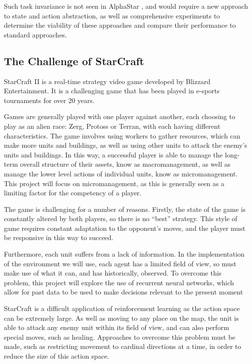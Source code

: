 Such task invariance is not seen in AlphaStar \cite{alphastar}, and would require a new approach to state and action abstraction, as well as comprehensive experiments to determine the viability of these approaches and compare their performance to standard approaches.


\subsection{The Challenge of StarCraft}

StarCraft II is a real-time strategy video game developed by Blizzard Entertainment. It is a challenging game that has been played in e-sports tournaments for over 20 years.

Games are generally played with one player against another, each choosing to play as an alien race: Zerg, Protoss or Terran, with each having different characteristics. The game involves using workers to gather resources, which can make more units and buildings, as well as using other units to attack the enemy's units and buildings. In this way, a successful player is able to manage the long-term overall structure of their assets, know as macromanagement, as well as manage the lower level actions of individual units, know as micromanagement. This project will focus on micromanagement, as this is generally seen as a limiting factor for the competency of a player.

The game is challenging for a number of reasons. Firstly, the state of the game is constantly altered by both players, so there is no ``best'' strategy. This style of game requires constant adaptation to the opponent's moves, and the player must be responsive in this way to succeed. 

Furthermore, each unit suffers from a lack of information. In the implementation of the environment we will use, each agent has a limited field of view, so must make use of what it can, and has historically, observed. To overcome this problem, this project will explore the use of recurrent neural networks, which allow for past data to be used to make decisions relevant to the present moment

StarCraft is a difficult application of reinforcement learning as the action space can be extremely large. As well as moving to any place on the map, the unit is able to attack any enemy unit within its field of view, and can also perform special moves, such as healing. Approaches to overcome this problem must be made, such as restricting movement to cardinal directions at a time, in order to reduce the size of this action space. 

